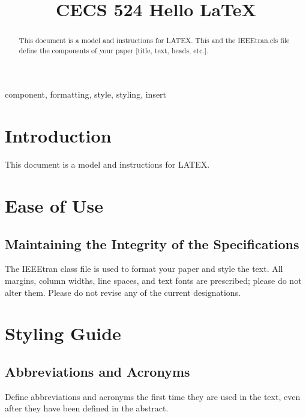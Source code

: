 \documentclass[conference]{IEEEtran}
\begin{document}
\title{CECS 524 Hello \LaTeX}

\author{
	}

\maketitle

\begin{abstract}
This document is a model and instructions for LATEX.
This and the IEEEtran.cls file define the components of your
paper [title, text, heads, etc.].
\end{abstract}

\begin{IEEEkeywords}
component, formatting, style, styling, insert
\end{IEEEkeywords}

\section{Introduction}
This document is a model and instructions for LATEX.

\section{Ease of Use}

\subsection{Maintaining the Integrity of the Specifications}

The IEEEtran class file is used to format your paper and style the text. All margins, column widths, line spaces, and text fonts are prescribed; please do not alter them. Please do not revise any of the current designations.

\section{Styling Guide}

\subsection{Abbreviations and Acronyms}
Define abbreviations and acronyms the first time they are
used in the text, even after they have been defined in the
abstract.
\end{document}
